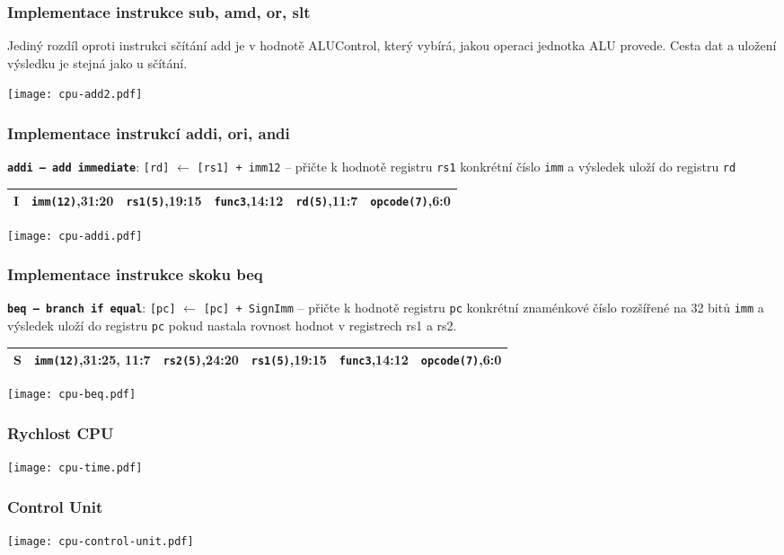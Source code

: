 \documentclass{beamer}
\begin{document}
\begin{frame}
\frametitle{Implementace instrukce sub, amd, or, slt}

Jediný rozdíl oproti instrukci sčítání add je v hodnotě ALUControl, který vybírá, jakou operaci jednotka ALU provede. Cesta dat a uložení výsledku je stejná jako u sčítání.
\bigskip

\bigskip

\texttt{[image: cpu-add2.pdf]}

\end{frame}


\begin{frame}[shrink=10]
\frametitle{Implementace instrukcí addi, ori, andi}

\textbf{\texttt{addi -- add immediate}}: \texttt{[rd]} $\leftarrow$ \texttt{[rs1] + imm12} -- přičte k hodnotě registru \texttt{rs1} konkrétní číslo \texttt{imm} a výsledek uloží do registru \texttt{rd}

\bigskip

\begin{tabular}{|l|l|l|l|l|l|}\hline
I & \textbf{\texttt{imm(12)}},31:20 & \textbf{\texttt{rs1(5)}},19:15 & \textbf{\texttt{func3}},14:12 & \textbf{\texttt{rd(5)}},11:7 & \textbf{\texttt{opcode(7)}},6:0 \\ \hline
\end{tabular}

\bigskip

\texttt{[image: cpu-addi.pdf]}

\end{frame}


\begin{frame}[shrink=15]
\frametitle{Implementace instrukce skoku beq}

\textbf{\texttt{beq -- branch if equal}}: \texttt{[pc]} $\leftarrow$ \texttt{[pc] + SignImm} -- přičte k hodnotě registru \texttt{pc} konkrétní znaménkové číslo rozšířené na 32 bitů \texttt{imm} a výsledek uloží do registru \texttt{pc} pokud nastala rovnost hodnot v registrech rs1 a rs2.

\bigskip

\begin{tabular}{|l|l|l|l|l|l|}\hline
S & \textbf{\texttt{imm(12)}},31:25, 11:7 & \textbf{\texttt{rs2(5)}},24:20 & \textbf{\texttt{rs1(5)}},19:15 & \textbf{\texttt{func3}},14:12 & \textbf{\texttt{opcode(7)}},6:0 \\ \hline
\end{tabular}

\bigskip

\texttt{[image: cpu-beq.pdf]}

\end{frame}


\begin{frame}
\frametitle{Rychlost CPU}

\bigskip

\texttt{[image: cpu-time.pdf]}

\end{frame}


\begin{frame}
\frametitle{Control Unit}

\bigskip

\texttt{[image: cpu-control-unit.pdf]}

\end{frame}
\end{document}

